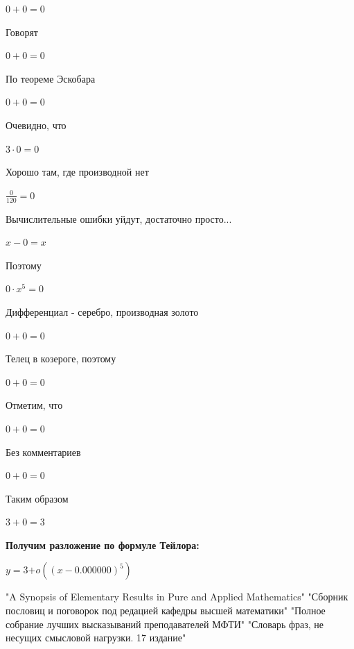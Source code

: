 \documentclass[12pt,a4paper,fleqn]{article}
\begin{document}
\begin{center}$0+0 = 0$\end{center}
Говорят

\begin{center}$0+0 = 0$\end{center}
По теореме Эскобара

\begin{center}$0+0 = 0$\end{center}
Очевидно, что

\begin{center}$3 \cdot 0 = 0$\end{center}
Хорошо там, где производной нет\cite{link2}

\begin{center}$\frac{0}{120} = 0$\end{center}
Вычислительные ошибки уйдут, достаточно просто...

\begin{center}
$x-0 = x$\end{center}
Поэтому

\begin{center}
$0 \cdot x^{5} = 0$\end{center}
Дифференциал - серебро, производная золото\cite{link2}

\begin{center}$0+0 = 0$\end{center}
Телец в козероге, поэтому

\begin{center}$0+0 = 0$\end{center}
Отметим, что

\begin{center}$0+0 = 0$\end{center}
Без комментариев\cite{link4}

\begin{center}$0+0 = 0$\end{center}
Таким образом

\begin{center}$3+0 = 3$\end{center}
\textbf{\LARGE{Получим разложение по формуле Тейлора:}}
\begin{center}
$y = $$3$$ + o((x - 0.000000)^{5})$
\end{center}
\newpage\begin{thebibliography}{}
  "A Synopsis of Elementary Results in Pure and Applied Mathematics"
  "Сборник пословиц и поговорок под редацией кафедры высшей математики"
  "Полное собрание лучших высказываний преподавателей МФТИ"
  "Словарь фраз, не несущих смысловой нагрузки. 17 издание"
\end{thebibliography}
\end{document}
